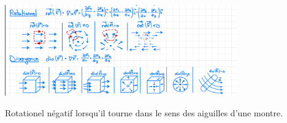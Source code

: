 \documentclass[]{article}
\begin{document}
\begin{multicols}{3}

\end{multicols}
\begin{multicols}{2}
\begin{center}
\includegraphics[width=10cm]{MicrosoftTeams-image.png}
\end{center}
Rotationel négatif lorsqu'il tourne dans le sens des aiguilles d'une montre.
\end{multicols}
\pagebreak
\begin{multicols}{3}

\end{multicols}
\end{document}

